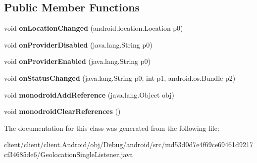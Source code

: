 \subsection*{Public Member Functions}
\begin{DoxyCompactItemize}
\item 
\hypertarget{classmd53d0d7e4f69ce69461d9217cf34685de6_1_1GeolocationSingleListener_aba3c508e782a36af68b07f89159bbe06}{}void {\bfseries on\+Location\+Changed} (android.\+location.\+Location p0)\label{classmd53d0d7e4f69ce69461d9217cf34685de6_1_1GeolocationSingleListener_aba3c508e782a36af68b07f89159bbe06}

\item 
\hypertarget{classmd53d0d7e4f69ce69461d9217cf34685de6_1_1GeolocationSingleListener_a8bf9cbbab5a02acfb043d9601673e894}{}void {\bfseries on\+Provider\+Disabled} (java.\+lang.\+String p0)\label{classmd53d0d7e4f69ce69461d9217cf34685de6_1_1GeolocationSingleListener_a8bf9cbbab5a02acfb043d9601673e894}

\item 
\hypertarget{classmd53d0d7e4f69ce69461d9217cf34685de6_1_1GeolocationSingleListener_a3b59d2378feb43de11733d80bc040cee}{}void {\bfseries on\+Provider\+Enabled} (java.\+lang.\+String p0)\label{classmd53d0d7e4f69ce69461d9217cf34685de6_1_1GeolocationSingleListener_a3b59d2378feb43de11733d80bc040cee}

\item 
\hypertarget{classmd53d0d7e4f69ce69461d9217cf34685de6_1_1GeolocationSingleListener_a91024ceadc659bfaf00c6815104d5150}{}void {\bfseries on\+Status\+Changed} (java.\+lang.\+String p0, int p1, android.\+os.\+Bundle p2)\label{classmd53d0d7e4f69ce69461d9217cf34685de6_1_1GeolocationSingleListener_a91024ceadc659bfaf00c6815104d5150}

\item 
\hypertarget{classmd53d0d7e4f69ce69461d9217cf34685de6_1_1GeolocationSingleListener_a509c9c5b4e855f048e973cb2fa2a1511}{}void {\bfseries monodroid\+Add\+Reference} (java.\+lang.\+Object obj)\label{classmd53d0d7e4f69ce69461d9217cf34685de6_1_1GeolocationSingleListener_a509c9c5b4e855f048e973cb2fa2a1511}

\item 
\hypertarget{classmd53d0d7e4f69ce69461d9217cf34685de6_1_1GeolocationSingleListener_a5f01c211499b6c3aff8b1a8bd6d95881}{}void {\bfseries monodroid\+Clear\+References} ()\label{classmd53d0d7e4f69ce69461d9217cf34685de6_1_1GeolocationSingleListener_a5f01c211499b6c3aff8b1a8bd6d95881}

\end{DoxyCompactItemize}


The documentation for this class was generated from the following file\+:\begin{DoxyCompactItemize}
\item 
client/client/client.\+Android/obj/\+Debug/android/src/md53d0d7e4f69ce69461d9217cf34685de6/Geolocation\+Single\+Listener.\+java\end{DoxyCompactItemize}
